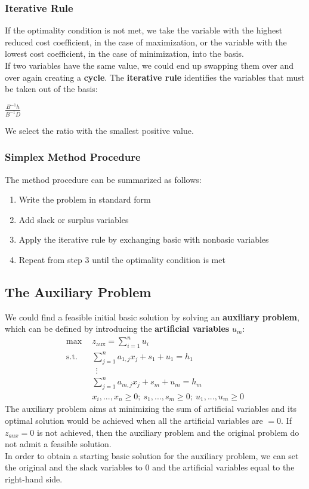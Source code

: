 \documentclass{article}
\begin{document}
\subsubsection{Iterative Rule}
If the optimality condition is not met, we take the variable with the highest reduced cost coefficient, in the case of maximization, or the variable with the lowest cost coefficient, in the case of minimization, into the basis. \\
If two variables have the same value, we could end up swapping them over and over again creating a \textbf{cycle}. The \textbf{iterative rule} identifies the variables that must be taken out of the basis:
\begin{center}
    $\displaystyle\frac{B^{-1}h}{B^{-1}D}$
\end{center}
We select the ratio with the smallest positive value.
\subsubsection{Simplex Method Procedure}
The method procedure can be summarized as follows:
\begin{enumerate}
    \item Write the problem in standard form
    \item Add slack or surplus variables
    \item Apply the iterative rule by exchanging basic with nonbasic variables
    \item Repeat from step $3$ until the optimality condition is met
\end{enumerate}
\subsection{The Auxiliary Problem}
We could find a feasible initial basic solution by solving an \textbf{auxiliary problem}, which can be defined by introducing the \textbf{artificial variables} $u_m$:
\begin{align*}
	\max~~ & z_{\text{aux}} = \sum_{i = 1}^n u_i \\
	\text{s.t.}~~ & \sum_{j = 1}^n a_{1,j}x_j+s_1+u_1 = h_1 \\
	~~&~~ \vdots \\
	~~& \sum_{j = 1}^n a_{m,j}x_j+s_m+u_m = h_m \\
	~~& x_i, ..., x_n \geq 0;~ s_1, ..., s_m \geq 0;~ u_1, ..., u_m \geq 0
\end{align*}
The auxiliary problem aims at minimizing the sum of artificial variables and its optimal solution would be achieved when all the artificial variables are $ = 0$. If $z_{aux} = 0$ is not achieved, then the auxiliary problem and the original problem do not admit a feasible solution. \\
In order to obtain a starting basic solution for the auxiliary problem, we can set the original and the slack variables to $0$ and the artificial variables equal to the right-hand side.
\end{document}

